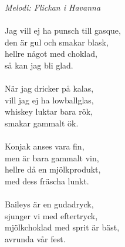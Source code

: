 {\footnotesize\textit{Melodi: Flickan i Havanna}}\\
\\
Jag vill ej ha punsch till gasque,\\
den är gul och smakar blask,\\
hellre något med choklad,\\
så kan jag bli glad.\\
\\
När jag dricker på kalas,\\
vill jag ej ha lowballglas,\\
whiskey luktar bara rök,\\
smakar gammalt ök.\\
\\
Konjak anses vara fin,\\
men är bara gammalt vin,\\
hellre då en mjölkprodukt,\\
med dess fräscha lunkt.\\
\\
Baileys är en gudadryck,\\
sjunger vi med eftertryck,\\
mjölkchoklad med sprit är bäst,\\
avrunda vår fest.
